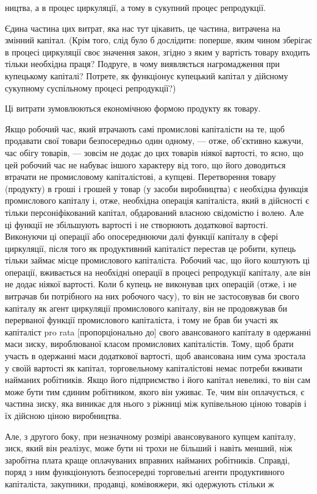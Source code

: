 ництва, а в процес циркуляції, а тому в сукупний процес репродукції.

Єдина частина цих витрат, яка нас тут цікавить, це частина,
витрачена на змінний капітал. (Крім того, слід було б дослідити:
поперше, яким чином зберігає в процесі циркуляції своє
значення закон, згідно з яким у вартість товару входить тільки
необхідна праця? Подруге, в чому виявляється нагромадження
при купецькому капіталі? Потрете, як функціонує купецький капітал
у дійсному сукупному суспільному процесі репродукції?)

Ці витрати зумовлюються економічною формою продукту як
товару.

Якщо робочий час, який втрачають самі промислові капіталісти
на те, щоб продавати свої товари безпосередньо один
одному, — отже, об’єктивно кажучи, час обігу товарів, — зовсім
не додає до цих товарів ніякої вартості, то ясно, що цей робочий
час не набуває іншого характеру від того, що його доводиться
втрачати не промисловому капіталістові, а купцеві. Перетворення
товару (продукту) в гроші і грошей у товар (у засоби
виробництва) є необхідна функція промислового капіталу і, отже,
необхідна операція капіталіста, який в дійсності є тільки персоніфікований
капітал, обдарований власною свідомістю і волею.
Але ці функції не збільшують вартості і не створюють додаткової
вартості. Виконуючи ці операції або опосереднюючи далі
функції капіталу в сфері циркуляції, після того як продуктивний
капіталіст перестав це робити, купець тільки займає місце
промислового капіталіста. Робочий час, що його коштують ці
операції, вживається на необхідні операції в процесі репродукції
капіталу, але він не додає ніякої вартості. Коли б купець
не виконував цих операцій (отже, і не витрачав би потрібного на
них робочого часу), то він не застосовував би свого капіталу
як агент циркуляції промислового капіталу, він не продовжував би
перерваної функції промислового капіталіста, і тому не брав би
участі як капіталіст pro rata [пропорціонально до] свого авансованого
капіталу в одержанні маси зиску, вироблюваної класом
промислових капіталістів. Тому, щоб брати участь в одержанні
маси додаткової вартості, щоб авансована ним сума зростала
у своїй вартості як капітал, торговельному капіталістові немає
потреби вживати найманих робітників. Якщо його підприємство
і його капітал невеликі, то він сам може бути тим єдиним робітником,
якого він уживає. Те, чим він оплачується, є частина
зиску, яка виникає для нього з ріжниці між купівельною ціною
товарів і їх дійсною ціною виробництва.

Але, з другого боку, при незначному розмірі авансовуваного
купцем капіталу, зиск, який він реалізує, може бути ні трохи
не більший і навіть менший, ніж заробітна плата краще оплачуваних
вправних найманих робітників. Справді, поряд з ним функціонують
безпосередні торговельні агенти продуктивного капіталіста,
закупники, продавці, комівояжери, які одержують стільки ж
